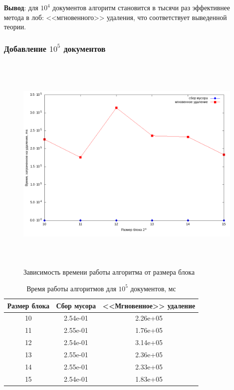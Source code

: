 \textbf{Вывод}: для $10^4$ документов алгоритм становится в тысячи раз
эффективнее метода в лоб: <<мгновенного>> удаления, что соответствует выведенной теории.

\subsubsection{Добавление $10^5$ документов}

\begin{figure}[H]
\includegraphics[width=\linewidth, height=11cm]{fig/time_1e5.png}
\caption{Зависимость времени работы алгоритма от размера блока}
\end{figure}

\begin{table}[H]
      \caption{Время работы алгоритмов для $10^5$ документов, мс}
      \centering
      \small
      \singlespacing
      \begin{tabular}{|c|c|c|}
            \hline
            Размер блока & Сбор мусора                & <<Мгновенное>> удаление \\ \hline \hline
            10           & 2.54e-01                   & 2.26e+05              \\ \hline
            11           & 2.55e-01                   & 1.76e+05              \\ \hline
            12           & 2.54e-01                   & 3.14e+05              \\ \hline
            13           & 2.55e-01                   & 2.36e+05              \\ \hline
            14           & 2.55e-01                   & 2.33e+05              \\ \hline
            15           & 2.54e-01                   & 1.83e+05              \\ \hline
\end{tabular}
\end{table}

